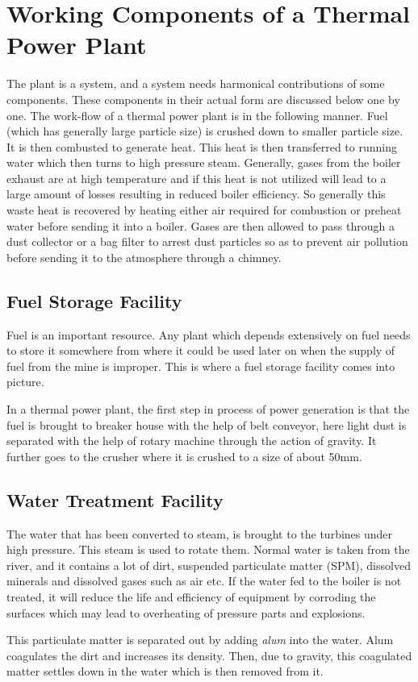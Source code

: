 \documentclass{report}
\begin{document}
\section{Working Components of a Thermal Power Plant}
The plant is a system, and a system needs harmonical contributions of some components. These components in their actual form are discussed below one by one. The work-flow of a thermal power plant is in the following manner. Fuel (which has generally large particle size) is crushed down to smaller particle size. It is then combusted to generate heat. This heat is then transferred to running water which then turns to high pressure steam. Generally, gases from the boiler exhaust are at high temperature and if this heat is not utilized will lead to a large amount of losses resulting in reduced boiler efficiency. So generally this waste heat is recovered by heating either air required for combustion or preheat water before sending it into a boiler. Gases are then allowed to pass through a dust collector or a bag filter to arrest dust particles so as to prevent air pollution before sending it to the atmosphere through a chimney.
\subsection{Fuel Storage Facility}
Fuel is an important resource. Any plant which depends extensively on fuel needs to store it somewhere from where it could be used later on when the supply of fuel from the mine is improper. This is where a fuel storage facility comes into picture. \par In a thermal power plant, the first step in process of power generation is that the fuel is brought to breaker house with the help of belt conveyor, here light dust is separated with the help of rotary machine through the action of gravity. It further goes to the crusher where it is crushed to a size of about 50mm.
\subsection{Water Treatment Facility}
The water that has been converted to steam, is brought to the turbines under high pressure. This steam is used to rotate them. Normal water is taken from the river, and it contains a lot of dirt, suspended particulate matter (SPM), dissolved minerals and dissolved gases such as air etc. If the water fed to the boiler is not treated, it will reduce the life and efficiency of equipment by corroding the surfaces which may lead to overheating of pressure parts and explosions. \par This particulate matter is separated out by adding {\it alum} into the water. Alum coagulates the dirt and increases its density. Then, due to gravity, this coagulated matter settles down in the water which is then removed from it. 
\end{document}
